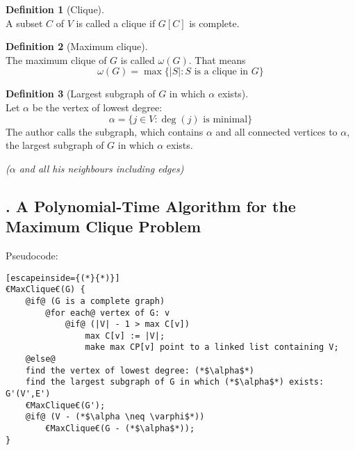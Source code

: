 \documentclass[12pt, xcolor=dvipsnames]{scrartcl}
\theoremstyle{definition}
\newtheorem{definition}{Definition}%
\theoremstyle{definition}
\begin{document}
\begin{definition}[Clique]\ \\
    A subset $C$ of $V$ is called a clique if $G[C]$ is complete.
\end{definition}

\begin{definition}[Maximum clique]\ \\
    The maximum clique of $G$ is called $\omega (G)$. That means  
    \[ \omega (G) = \max\{|S| : S \text{ is a clique in }G\} \]
\end{definition}

\begin{definition}[Largest subgraph of $G$ in which $\alpha$ exists]\ \\
    Let $\alpha$ be the vertex of lowest degree:
    \[ \alpha = \{j \in V : \deg(j) \text{ is minimal}\} \]
    The author calls the subgraph, which contains $\alpha$ and all connected vertices to $\alpha$, the largest subgraph of $G$ in which $\alpha$ exists.

    \textit{($\alpha$ and all his neighbours including edges)}
\end{definition}

\subsection*{. A Polynomial-Time Algorithm for the Maximum Clique Problem}

Pseudocode:


\lstset{style=mystyle}

\begin{lstlisting}[escapeinside={(*}{*)}]
€MaxClique€(G) {
    @if@ (G is a complete graph)
        @for each@ vertex of G: v
            @if@ (|V| - 1 > max C[v])
                max C[v] := |V|;
                make max CP[v] point to a linked list containing V;
    @else@
    find the vertex of lowest degree: (*$\alpha$*)
    find the largest subgraph of G in which (*$\alpha$*) exists: G'(V',E')
    €MaxClique€(G');
    @if@ (V - (*$\alpha \neq \varphi$*))
        €MaxClique€(G - (*$\alpha$*));
}
\end{lstlisting}
\end{document}
